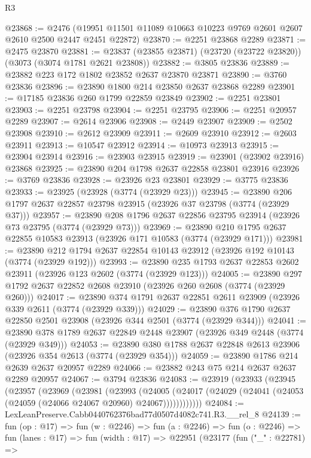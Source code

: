 \begin{lexlean}{R3}
\begin{coremodule}
@23868 := @2476
    (@19951 @11501 @11089 @10663 @10223 @9769 @2601 @2607 @2610 @2500 @2447 @2451 @22872)
@23870 := @2251 @23868 @2289
@23871 := @2475 @23870
@23881 := @23837 (@23855 @23871) (@23720 (@23722 @23820)) (@3073 (@3074 @1781 @2621 @23808))
@23882 := @3805 @23836
@23889 := @23882 @223 @172 @1802 @23852 @2637 @23870 @23871
@23890 := @3760 @23836
@23896 := @23890 @1800 @214 @23850 @2637 @23868 @2289
@23901 := @17185 @23836 @260 @1799 @22859 @23849
@23902 := @2251 @23801
@23903 := @2251 @23798
@23904 := @2251 @23795
@23906 := @2251 @20957 @2289
@23907 := @2614 @23906
@23908 := @2449 @23907
@23909 := @2502 @23908
@23910 := @2612 @23909
@23911 := @2609 @23910
@23912 := @2603 @23911
@23913 := @10547 @23912
@23914 := @10973 @23913
@23915 := @23904 @23914
@23916 := @23903 @23915
@23919 := @23901 (@23902 @23916) @23868
@23925 := @23890 @204 @1798 @2637 @22858 @23801 @23916
@23926 := @3769 @23836
@23928 := @23926 @23 @23801
@23929 := @3775 @23836
@23933 := @23925 (@23928 (@3774 (@23929 @23)))
@23945 := @23890 @206 @1797 @2637 @22857 @23798 @23915 (@23926 @37 @23798 (@3774 (@23929 @37)))
@23957 := @23890 @208 @1796 @2637 @22856 @23795 @23914 (@23926 @73 @23795 (@3774 (@23929 @73)))
@23969 := @23890 @210 @1795 @2637 @22855 @10583 @23913 (@23926 @171 @10583 (@3774 (@23929 @171)))
@23981 := @23890 @212 @1794 @2637 @22854 @10143 @23912 (@23926 @192 @10143 (@3774 (@23929 @192)))
@23993 := @23890 @235 @1793 @2637 @22853 @2602 @23911 (@23926 @123 @2602 (@3774 (@23929 @123)))
@24005 := @23890 @297 @1792 @2637 @22852 @2608 @23910 (@23926 @260 @2608 (@3774 (@23929 @260)))
@24017 := @23890 @374 @1791 @2637 @22851 @2611 @23909 (@23926 @339 @2611 (@3774 (@23929 @339)))
@24029 := @23890 @376 @1790 @2637 @22850 @2501 @23908 (@23926 @344 @2501 (@3774 (@23929 @344)))
@24041 := @23890 @378 @1789 @2637 @22849 @2448 @23907 (@23926 @349 @2448 (@3774 (@23929 @349)))
@24053 := @23890 @380 @1788 @2637 @22848 @2613 @23906 (@23926 @354 @2613 (@3774 (@23929 @354)))
@24059 := @23890 @1786 @214 @2639 @2637 @20957 @2289
@24066 := @23882 @243 @75 @214 @2637 @2637 @2289 @20957
@24067 := @3794 @23836
@24083 := @23919
    (@23933
      (@23945
        (@23957
          (@23969
            (@23981
              (@23993
                (@24005
                  (@24017 (@24029 (@24041 (@24053 (@24059 (@24066 @24067 @20960) @24067))))))))))))
@24084 := LexLeanPreserve.Cabb0440762376bad77d0507d4082c741.R3.__rel_8
@24139 := fun (op : @17) =>
  fun (w : @2246) =>
  fun (a : @2246) =>
  fun (o : @2246) =>
  fun (lanes : @17) =>
  fun (width : @17) =>
  @22951
    (@23177
      (fun ("_" : @22781) =>

\end{coremodule}
\end{lexlean}
